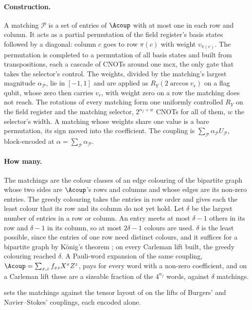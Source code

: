 \paragraph{Construction.} A matching $\mathcal{P}$ is a set of entries of $\Acoup$ with at most one in each row and column. It acts as a partial permutation of the field register's basis states followed by a diagonal: column $c$ goes to row $\pi(c)$ with weight $v_{\pi(c)}$. The permutation is completed to a permutation of all basis states and built from transpositions, each a cascade of CNOTs around one \gls{mcx}, the only gate that takes the selector's control. The weights, divided by the matching's largest magnitude $\alpha_{\mathcal P}$, lie in $[-1,1]$ and are applied as $R_Y(2\arccos v_r)$ on a flag qubit, whose zero then carries $v_r$, with weight zero on a row the matching does not reach. The rotations of every matching form one uniformly controlled $R_Y$ on the field register and the matching selector, $2^{n_f+w}$ CNOTs for all of them, $w$ the selector's width. A matching whose weights share one value is a bare permutation, its sign moved into the coefficient. The coupling is $\sum_{\mathcal P}\alpha_{\mathcal P}U_{\mathcal P}$, block-encoded at $\alpha=\sum_{\mathcal P}\alpha_{\mathcal P}$.

\paragraph{How many.} The matchings are the colour classes of an edge colouring of the bipartite graph whose two sides are $\Acoup$'s rows and columns and whose edges are its non-zero entries. The greedy colouring takes the entries in row order and gives each the least colour that its row and its column do not yet hold. Let $\delta$ be the largest number of entries in a row or column. An entry meets at most $\delta-1$ others in its row and $\delta-1$ in its column, so at most $2\delta-1$ colours are used. $\delta$ is the least possible, since the entries of one row need distinct colours, and it suffices for a bipartite graph by K\"onig's theorem \cite{konig1916graphen}; on every Carleman lift built, the greedy colouring reached $\delta$. A Pauli-word expansion of the same coupling, $\Acoup=\sum_{x,z}f_{xz}X^xZ^z$, pays for every word with a non-zero coefficient, and on a Carleman lift these are a sizeable fraction of the $4^{n_f}$ words, against $\delta$ matchings.

 sets the matchings against the tensor layout of  on the lifts of Burgers' and Navier--Stokes' couplings, each encoded alone.

